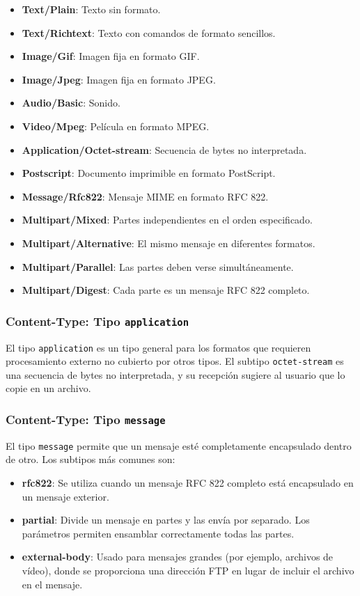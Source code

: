 \documentclass[a4paper,12pt]{article}
\begin{document}
\begin{itemize}
    \item \textbf{Text/Plain}: Texto sin formato.
    \item \textbf{Text/Richtext}: Texto con comandos de formato sencillos.
    \item \textbf{Image/Gif}: Imagen fija en formato GIF.
    \item \textbf{Image/Jpeg}: Imagen fija en formato JPEG.
    \item \textbf{Audio/Basic}: Sonido.
    \item \textbf{Video/Mpeg}: Película en formato MPEG.
    \item \textbf{Application/Octet-stream}: Secuencia de bytes no interpretada.
    \item \textbf{Postscript}: Documento imprimible en formato PostScript.
    \item \textbf{Message/Rfc822}: Mensaje MIME en formato RFC 822.
    \item \textbf{Multipart/Mixed}: Partes independientes en el orden especificado.
    \item \textbf{Multipart/Alternative}: El mismo mensaje en diferentes formatos.
    \item \textbf{Multipart/Parallel}: Las partes deben verse simultáneamente.
    \item \textbf{Multipart/Digest}: Cada parte es un mensaje RFC 822 completo.
\end{itemize}

\subsubsection{Content-Type: Tipo \texttt{application}}
El tipo \texttt{application} es un tipo general para los formatos que requieren procesamiento externo no cubierto por otros tipos. El subtipo \texttt{octet-stream} es una secuencia de bytes no interpretada, y su recepción sugiere al usuario que lo copie en un archivo.

\subsubsection{Content-Type: Tipo \texttt{message}}
El tipo \texttt{message} permite que un mensaje esté completamente encapsulado dentro de otro. Los subtipos más comunes son:

\begin{itemize}
    \item \textbf{rfc822}: Se utiliza cuando un mensaje RFC 822 completo está encapsulado en un mensaje exterior.
    \item \textbf{partial}: Divide un mensaje en partes y las envía por separado. Los parámetros permiten ensamblar correctamente todas las partes.
    \item \textbf{external-body}: Usado para mensajes grandes (por ejemplo, archivos de vídeo), donde se proporciona una dirección FTP en lugar de incluir el archivo en el mensaje.
\end{itemize}
\end{document}
